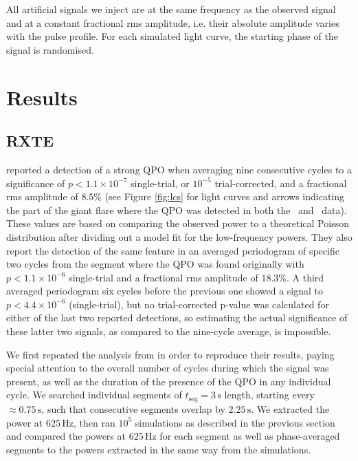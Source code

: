 \documentclass{emulateapj}
\begin{document}
All artificial signals we inject are at the same frequency as the observed signal and at a constant fractional rms amplitude, i.e. their absolute amplitude varies with the pulse profile. For each simulated light curve, the starting phase of the signal is randomised. 



\section{Results}
\label{sec:results}

\subsection{RXTE}
\label{sec:rxte_results}


\citealt{Strohmayer06} reported a detection of a strong QPO when averaging nine consecutive cycles to a significance of $p < 1.1 \times 10^{-7}$ single-trial, or $10^{-5}$ trial-corrected, and a fractional rms amplitude of $8.5\%$ (see Figure \ref{fig:lcs} for light curves and arrows indicating the part of the giant flare where the QPO was detected in both the \rxte\ and \rhessi\ data). These values are based on comparing the observed power to a theoretical Poisson distribution after dividing out a model fit for the low-frequency powers. They also report the detection of the same feature in an averaged periodogram of specific two cycles from the segment where the QPO was found originally with $p < 1.1 \times 10^{-6}$ single-trial and a fractional rms amplitude of $18.3\%$. A third averaged periodogram six cycles before the previous one showed a signal to $p < 4.4 \times 10^{-6}$ (single-trial), but no trial-corrected p-value was calculated for either of the last two reported detections, so estimating the actual significance of these latter two signals, as compared to the nine-cycle average, is impossible.

We first repeated the analysis from \citealt{Strohmayer06} in order to reproduce their results, paying special attention to the overall number of cycles during which the signal was present, as well as the duration of the presence of the QPO in any individual cycle.
We searched individual segments of $t_{\mathrm{seg}} = 3 \, \mathrm{s}$ length, starting every $\approx 0.75 \, \mathrm{s}$, such that consecutive segments overlap by $2.25 \, \mathrm{s}$. We extracted the power at $625 \, \mathrm{Hz}$, then ran $10^5$ simulations as described in the previous section and compared the powers at $625 \, \mathrm{Hz}$ for each segment as well as phase-averaged segments to the powers extracted in the same way from the simulations.
\end{document}

